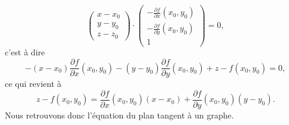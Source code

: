 \begin{equation}
    \begin{pmatrix}
        x-x_0    \\
        y-y_0    \\
        z-z_0
    \end{pmatrix}\cdot
    \begin{pmatrix}
        -\frac{ \partial f }{ \partial x }(x_0,y_0)    \\
        -\frac{ \partial f }{ \partial y }(x_0,y_0)    \\
        1
    \end{pmatrix}=0,
\end{equation}
c'est à dire
\begin{equation}
    -(x-x_0)\frac{ \partial f }{ \partial x }(x_0,y_0)-(y-y_0)\frac{ \partial f }{ \partial y }(x_0,y_0)+z-f(x_0,y_0)=0,
\end{equation}
ce qui revient à
\begin{equation}
    z-f(x_0,y_0)=\frac{ \partial f }{ \partial x }(x_0,y_0)(x-x_0)+\frac{ \partial f }{ \partial y }(x_0,y_0)(y-y_0).
\end{equation}
Nous retrouvons donc l'équation du plan tangent à un graphe.

